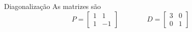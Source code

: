 \begin{resolution}{Diagonalização}
  As matrizes são
  \[
    P=
    \begin{bmatrix}
      1 & 1  \\
      1 & -1
    \end{bmatrix}
    \qquad\qquad
    D=
    \begin{bmatrix}
      3 & 0 \\
      0 & 1
    \end{bmatrix}
  \]
\end{resolution}

\endinput
